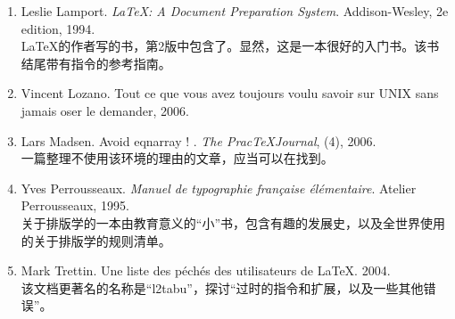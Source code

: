 \begin{enumerate}
    关于\TeX 的\textbf{唯一}圣经。该书充满了“危险的转折”，十分详细第解释了\TeX 的内部机制。这是本相当难读的参考书，并且没有为初学者准备有关\TeX 的介绍——我认为是这样。
    \item Leslie Lamport. \emph{\LaTeX : A Document Preparation System}. Addison-Wesley, 2e edition, 1994.\\
    \LaTeX 的作者写的书，第2版中包含了\LaTeXe 。显然，这是一本很好的入门书。该书结尾带有指令的参考指南。
    \item Vincent Lozano. Tout ce que vous avez toujours voulu savoir sur UNIX sans jamais oser le demander, 2006. 
    \item Lars Madsen. Avoid eqnarray ! . \emph{The Prac\TeX Journal}, (4), 2006.\\
    一篇整理不使用该环境的理由的文章，应当可以在找到。
    \item Yves Perrousseaux. \emph{Manuel de typographie française élémentaire}. Atelier Perrousseaux, 1995.\\
    关于排版学的一本由教育意义的“小”书，包含有趣的发展史，以及全世界使用的关于排版学的规则清单。
    \item Mark Trettin. Une liste des péchés des utilisateurs de \LaTeX. 2004.\\
    该文档更著名的名称是“l2tabu”，探讨“过时的指令和扩展，以及一些其他错误”。
\end{enumerate}